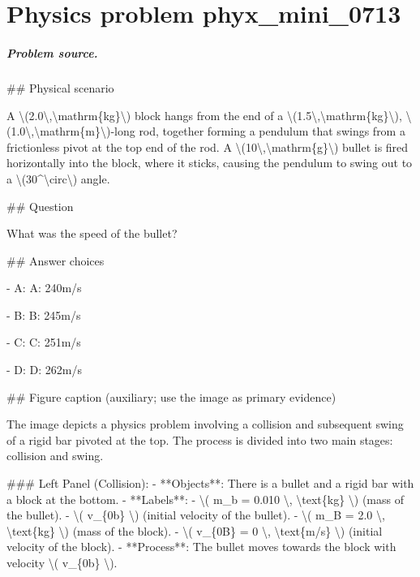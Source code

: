 
\chapter{Physics problem phyx\_mini\_0713}
\label{ch:PhyXMiniProblems_problem_phyx_mini_0713}

\paragraph{Problem source.}
\#\# Physical scenario

A \textbackslash{}(2.0\textbackslash{},\textbackslash{}mathrm\{kg\}\textbackslash{}) block hangs from the end of a \textbackslash{}(1.5\textbackslash{},\textbackslash{}mathrm\{kg\}\textbackslash{}), \textbackslash{}(1.0\textbackslash{},\textbackslash{}mathrm\{m\}\textbackslash{})-long rod, together forming a pendulum that swings from a frictionless pivot at the top end of the rod. A \textbackslash{}(10\textbackslash{},\textbackslash{}mathrm\{g\}\textbackslash{}) bullet is fired horizontally into the block, where it sticks, causing the pendulum to swing out to a \textbackslash{}(30\textasciicircum{}\textbackslash{}circ\textbackslash{}) angle.

\#\# Question

What was the speed of the bullet?

\#\# Answer choices

- A: A: 240m/s

- B: B: 245m/s

- C: C: 251m/s

- D: D: 262m/s

\#\# Figure caption (auxiliary; use the image as primary evidence)

The image depicts a physics problem involving a collision and subsequent swing of a rigid bar pivoted at the top. The process is divided into two main stages: collision and swing.

\#\#\# Left Panel (Collision):
- **Objects**: There is a bullet and a rigid bar with a block at the bottom.
- **Labels**: 
  - \textbackslash{}( m\_b = 0.010 \textbackslash{}, \textbackslash{}text\{kg\} \textbackslash{}) (mass of the bullet).
  - \textbackslash{}( v\_\{0b\} \textbackslash{}) (initial velocity of the bullet).
  - \textbackslash{}( m\_B = 2.0 \textbackslash{}, \textbackslash{}text\{kg\} \textbackslash{}) (mass of the block).
  - \textbackslash{}( v\_\{0B\} = 0 \textbackslash{}, \textbackslash{}text\{m/s\} \textbackslash{}) (initial velocity of the block).
- **Process**: The bullet moves towards the block with velocity \textbackslash{}( v\_\{0b\} \textbackslash{}).

